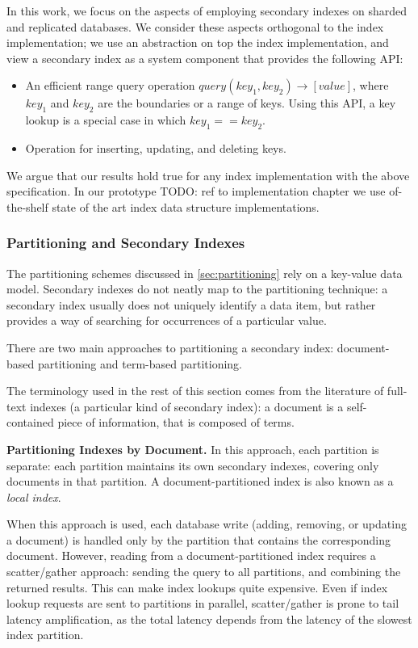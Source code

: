 In this work, we focus on the aspects of employing secondary indexes on sharded and replicated databases.
We consider these aspects orthogonal to the index implementation;
we use an abstraction on top the index implementation, and view a secondary index as a system component that provides
the following API:
\begin{itemize}
  \item An efficient range query operation $query(key_1, key_2) \rightarrow [value]$,
  where $key_1$ and $key_2$ are the boundaries or a range of keys.
  Using this API, a key lookup is a special case in which $key_1 == key_2$.

  \item Operation for inserting, updating, and deleting keys.
\end{itemize}
We argue that our results hold true for any index implementation with the above specification.
In our prototype
TODO: ref to implementation chapter
we use of-the-shelf state of the art index data structure implementations.

\subsubsection{Partitioning and Secondary Indexes}

The partitioning schemes discussed in \ref{sec:partitioning} rely on a key-value data model.
Secondary indexes do not neatly map to the partitioning technique:
a secondary index usually does not uniquely identify a data item, but rather provides a way of searching for occurrences
of a particular value.

There are two main approaches to partitioning a secondary index:
document-based partitioning and term-based partitioning.

The terminology used in the rest of this section comes from the literature of full-text indexes (a particular kind of secondary index):
a document is a self-contained piece of information, that is composed of terms.

\bigskip

\noindent
\textbf{Partitioning Indexes by Document.}
In this approach, each partition is separate:
each partition maintains its own secondary indexes, covering only documents in that partition.
A document-partitioned index is also known as a \textit{local index}.

When this approach is used, each database write (adding, removing, or updating a document) is handled only by the
partition that contains the corresponding document.
However, reading from a document-partitioned index requires a scatter/gather approach:
sending the query to all partitions, and combining the returned results.
This can make index lookups quite expensive.
Even if index lookup requests are sent to partitions in parallel, scatter/gather is prone to tail latency amplification,
as the total latency depends from the latency of the slowest index partition.

